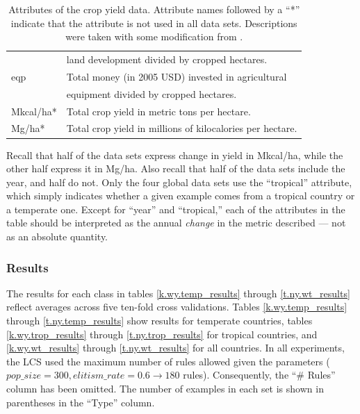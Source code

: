 \documentclass[11pt]{article}
\begin{document}
\begin{table}[h!]
\begin{tabular}{ll}
& land development divided by cropped hectares. \\
eqp & Total money (in 2005 USD) invested in agricultural \\
&  equipment divided by cropped hectares. \\
Mkcal/ha* & Total crop yield in metric tons per hectare. \\
Mg/ha* & Total crop yield in millions of kilocalories per hectare. \\
\bottomrule 
\end{tabular}
\caption{Attributes of the crop yield data. Attribute names followed by a ``*'' indicate that the attribute is not used in all data sets. Descriptions were taken with some modification from \cite{nelson_measuring_2016}.}
\label{crop_attributes}
\end{table}
Recall that half of the data sets express change in yield in Mkcal/ha, while the other half express it in Mg/ha. Also recall that half of the data sets include the year, and half do not. Only the four global data sets use the ``tropical'' attribute, which simply indicates whether a given example comes from a tropical country or a temperate one. Except for ``year'' and ``tropical,'' each of the attributes in the table should be interpreted as the annual \emph{change} in the metric described --- not as an absolute quantity. 

\subsubsection{Results}
The results for each class in tables \ref{k.wy.temp_results} through \ref{t.ny.wt_results} reflect averages across five ten-fold cross validations. Tables \ref{k.wy.temp_results} through \ref{t.ny.temp_results} show results for temperate countries, tables \ref{k.wy.trop_results} through \ref{t.ny.trop_results} for tropical countries, and \ref{k.wy.wt_results} through \ref{t.ny.wt_results} for all countries. In all experiments, the LCS used the maximum number of rules allowed given the parameters ($pop\_size = 300, elitism\_rate = 0.6 \longrightarrow 180$ rules). Consequently, the ``\# Rules'' column has been omitted. The number of examples in each set is shown in parentheses in the ``Type'' column.
\end{document}
